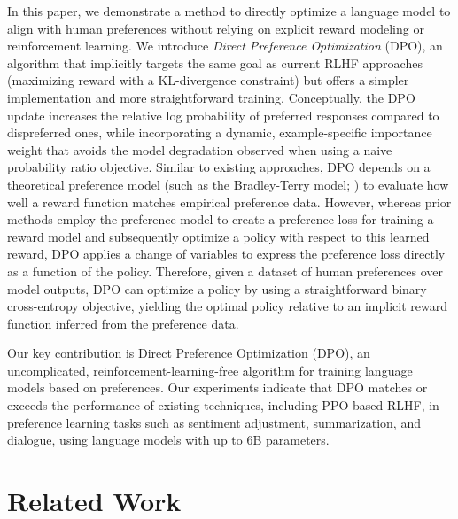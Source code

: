 In this paper, we demonstrate a method to directly optimize a language model to align with human preferences without relying on explicit reward modeling or reinforcement learning. We introduce \textit{Direct Preference Optimization} (DPO), an algorithm that implicitly targets the same goal as current RLHF approaches (maximizing reward with a KL-divergence constraint) but offers a simpler implementation and more straightforward training. Conceptually, the DPO update increases the relative log probability of preferred responses compared to dispreferred ones, while incorporating a dynamic, example-specific importance weight that avoids the model degradation observed when using a naive probability ratio objective. Similar to existing approaches, DPO depends on a theoretical preference model (such as the Bradley-Terry model; \cite{bradley1952rankanalysis}) to evaluate how well a reward function matches empirical preference data. However, whereas prior methods employ the preference model to create a preference loss for training a reward model and subsequently optimize a policy with respect to this learned reward, DPO applies a change of variables to express the preference loss directly as a function of the policy. Therefore, given a dataset of human preferences over model outputs, DPO can optimize a policy by using a straightforward binary cross-entropy objective, yielding the optimal policy relative to an implicit reward function inferred from the preference data.

Our key contribution is Direct Preference Optimization (DPO), an uncomplicated, reinforcement-learning-free algorithm for training language models based on preferences. Our experiments indicate that DPO matches or exceeds the performance of existing techniques, including PPO-based RLHF, in preference learning tasks such as sentiment adjustment, summarization, and dialogue, using language models with up to 6B parameters.

\section{Related Work}

